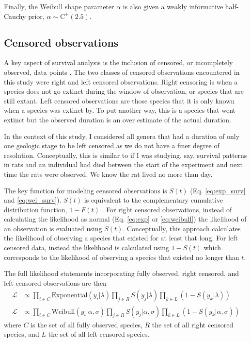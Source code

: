 \documentclass[12pt,letterpaper]{article}
\begin{document}
Finally, the Weibull shape parameter \(\alpha\) is also given a weakly informative half-Cauchy prior, \(\alpha \sim \mathrm{C}^{+}(2.5)\). 

\subsection{Censored observations}
A key aspect of survival analysis is the inclusion of censored, or incompletely observed, data points \citep{Ibrahim2001,Klein2003}. The two classes of censored observations encountered in this study were right and left censored observations. Right censoring is when a species does not go extinct during the window of observation, or species that are still extant. Left censored observations are those species that it is only known when a species was extinct by. To put another way, this is a species that went extinct but the observed duration is an over estimate of the actual duration. 

In the context of this study, I considered all genera that had a duration of only one geologic stage to be left censored as we do not have a finer degree of resolution. Conceptually, this is similar to if I was studying, say, survival patterns in rats and an individual had died between the start of the experiment and next time the rats were observed. We know the rat lived no more than day.

The key function for modeling censored observations is \(S(t)\) (Eq. \ref{eq:exp_surv} and \ref{eq:wei_surv}). \(S(t)\) is equivalent to the complementary cumulative distribution function, \(1 - F(t)\) \citep{Klein2003}. For right censored observations, instead of calculating the likelihood as normal (Eq. \ref{eq:exp} or \ref{eq:weibull}) the likelihood of an observation is evaluated using \(S(t)\). Conceptually, this approach calculates the likelihood of observing a species that existed for at least that long. For left censored data, instead the likelihood is calculated using \(1 - S(t)\) which corresponds to the likelihood of observing a species that existed no longer than \(t\).

The full likelihood statements incorporating fully observed, right censored, and left censored observations are then
\begin{equation}
  \begin{aligned}
    \mathcal{L} &\propto \prod_{i \in C} \mathrm{Exponential}(y_{i} | \lambda) \prod_{j \in R} S(y_{j} | \lambda) \prod_{k \in L} \left(1 - S(y_{k} | \lambda)\right) \\
    \mathcal{L} &\propto \prod_{i \in C} \mathrm{Weibull}(y_{i} | \alpha, \sigma) \prod_{j \in R} S(y_{j} | \alpha, \sigma) \prod_{k \in L} \left(1 - S(y_{k} | \alpha, \sigma)\right)
  \end{aligned}
  \label{eq:censored_likelihood}
\end{equation}
where \(C\) is the set of all fully observed species, \(R\) the set of all right censored species, and \(L\) the set of all left-censored species.
\end{document}
